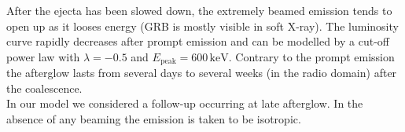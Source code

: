 \documentclass[a0,portrait]{a0poster}
\newcommand{\ECM}[1] {\textbf{\textcolor{magenta}{#1}}}
\begin{document}
\begin{multicols}{2}

After the ejecta has been slowed down, the extremely beamed emission tends to open up as it looses energy (GRB is mostly visible in soft X-ray). The luminosity curve rapidly decreases after prompt emission and can be modelled by a cut-off power law with $\lambda = - 0.5$ and $E_{\mathrm{peak}} = 600 \, \mathrm{keV}$. Contrary to the prompt emission the afterglow lasts from several days to several weeks (in the radio domain) after the coalescence. \\
\indent In our model we considered a follow-up occurring at late afterglow. In the absence of any beaming the emission is taken to be isotropic.




\end{multicols}
\end{document}
